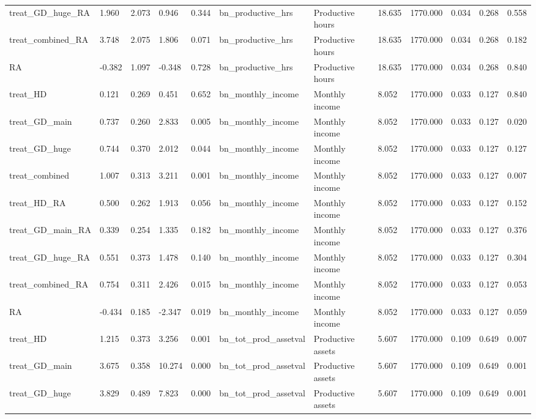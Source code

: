 \begin{tabular}{llllllllllll}
treat\_GD\_huge\_RA & 1.960 & 2.073 & 0.946 & 0.344 & bn\_productive\_hrs & Productive hours & 18.635 & 1770.000 & 0.034 & 0.268 & 0.558 \\
treat\_combined\_RA & 3.748 & 2.075 & 1.806 & 0.071 & bn\_productive\_hrs & Productive hours & 18.635 & 1770.000 & 0.034 & 0.268 & 0.182 \\
RA & -0.382 & 1.097 & -0.348 & 0.728 & bn\_productive\_hrs & Productive hours & 18.635 & 1770.000 & 0.034 & 0.268 & 0.840 \\
treat\_HD & 0.121 & 0.269 & 0.451 & 0.652 & bn\_monthly\_income & Monthly income & 8.052 & 1770.000 & 0.033 & 0.127 & 0.840 \\
treat\_GD\_main & 0.737 & 0.260 & 2.833 & 0.005 & bn\_monthly\_income & Monthly income & 8.052 & 1770.000 & 0.033 & 0.127 & 0.020 \\
treat\_GD\_huge & 0.744 & 0.370 & 2.012 & 0.044 & bn\_monthly\_income & Monthly income & 8.052 & 1770.000 & 0.033 & 0.127 & 0.127 \\
treat\_combined & 1.007 & 0.313 & 3.211 & 0.001 & bn\_monthly\_income & Monthly income & 8.052 & 1770.000 & 0.033 & 0.127 & 0.007 \\
treat\_HD\_RA & 0.500 & 0.262 & 1.913 & 0.056 & bn\_monthly\_income & Monthly income & 8.052 & 1770.000 & 0.033 & 0.127 & 0.152 \\
treat\_GD\_main\_RA & 0.339 & 0.254 & 1.335 & 0.182 & bn\_monthly\_income & Monthly income & 8.052 & 1770.000 & 0.033 & 0.127 & 0.376 \\
treat\_GD\_huge\_RA & 0.551 & 0.373 & 1.478 & 0.140 & bn\_monthly\_income & Monthly income & 8.052 & 1770.000 & 0.033 & 0.127 & 0.304 \\
treat\_combined\_RA & 0.754 & 0.311 & 2.426 & 0.015 & bn\_monthly\_income & Monthly income & 8.052 & 1770.000 & 0.033 & 0.127 & 0.053 \\
RA & -0.434 & 0.185 & -2.347 & 0.019 & bn\_monthly\_income & Monthly income & 8.052 & 1770.000 & 0.033 & 0.127 & 0.059 \\
treat\_HD & 1.215 & 0.373 & 3.256 & 0.001 & bn\_tot\_prod\_assetval & Productive assets & 5.607 & 1770.000 & 0.109 & 0.649 & 0.007 \\
treat\_GD\_main & 3.675 & 0.358 & 10.274 & 0.000 & bn\_tot\_prod\_assetval & Productive assets & 5.607 & 1770.000 & 0.109 & 0.649 & 0.001 \\
treat\_GD\_huge & 3.829 & 0.489 & 7.823 & 0.000 & bn\_tot\_prod\_assetval & Productive assets & 5.607 & 1770.000 & 0.109 & 0.649 & 0.001 \\

\end{tabular}
